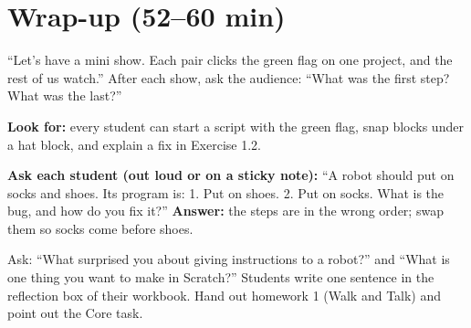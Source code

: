 \section{Wrap-up (52--60 min)}
\begin{teacherscript}
\enquote{Let's have a mini show. Each pair clicks the green flag on one project, and the rest of us watch.} After each show, ask the audience: \enquote{What was the first step? What was the last?}
\end{teacherscript}

\begin{formativecheck}
\textbf{Look for:} every student can start a script with the green flag, snap blocks under a hat block, and explain a fix in Exercise 1.2.

\textbf{Ask each student (out loud or on a sticky note):} \enquote{A robot should put on socks and shoes. Its program is: 1. Put on shoes. 2. Put on socks. What is the bug, and how do you fix it?}
\textbf{Answer:} the steps are in the wrong order; swap them so socks come before shoes.
\end{formativecheck}

\begin{reflection}
Ask: \enquote{What surprised you about giving instructions to a robot?} and \enquote{What is one thing you want to make in Scratch?} Students write one sentence in the reflection box of their workbook. Hand out homework 1 (Walk and Talk) and point out the Core task.
\end{reflection}


